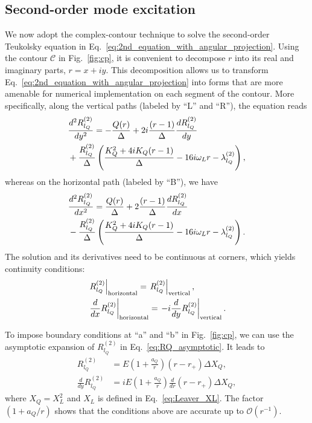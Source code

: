 \documentclass[aps,prd,amsmath,floats,floatfix, twocolumn,
superscriptaddress,nofootinbib,showpacs]{revtex4-1}
\begin{document}
\subsection{Second-order mode excitation}
\label{subsec:contour_2nd_excitation}
We now adopt the complex-contour technique to solve the second-order Teukolsky equation in Eq.~\eqref{eq:2nd_equation_with_angular_projection}. Using the contour $\mathcal{C}$ in Fig.~\ref{fig:cp}, it is convenient to decompose $r$ into its real and imaginary parts, $r=x+iy$. This decomposition allows us to transform Eq.~\eqref{eq:2nd_equation_with_angular_projection} into forms that are more amenable for numerical implementation on each segment of the contour. More specifically, along the vertical paths (labeled by ``L'' and ``R''), the equation reads 
\begin{align}
    & \frac{d^2 R_{l_Q}^{(2)}}{dy^2}=-\frac{Q(r)}{\Delta}+2i\frac{(r-1)}{\Delta}\frac{d R_{l_Q}^{(2)}}{dy}\notag \\
    &+\frac{R_{l_Q}^{(2)}}{\Delta}\left(\frac{K_Q^2+4iK_Q(r-1)}{\Delta}-16i\omega_L r-\lambda^{(2)}_{l_Q}\right), \label{eq:2nd_t_eq_vertical}
\end{align}
whereas on the horizontal path (labeled by ``B''), we have
\begin{align}
    & \frac{d^2 R_{l_Q}^{(2)}}{dx^2}=\frac{Q(r)}{\Delta}+2\frac{(r-1)}{\Delta}\frac{d R_{l_Q}^{(2)}}{dx}\notag \\
    &-\frac{R_{l_Q}^{(2)}}{\Delta}\left(\frac{K_Q^2+4iK_Q(r-1)}{\Delta}-16i\omega_L r-\lambda^{(2)}_{l_Q}\right). \label{eq:2nd_t_eq_horizontal}
\end{align}
The solution and its derivatives need to be continuous at corners, which yields continuity conditions:
\begin{subequations}
\label{eq:continuity_eq}
    \begin{align}
    &\left.R_{l_Q}^{(2)}\right|_{\rm{horizontal}}=\left.R_{l_Q}^{(2)}\right|_{\rm{vertical}}, \\
    &\left.\frac{d}{dx}R_{l_Q}^{(2)}\right|_{\rm{horizontal}}=\left.-i\frac{d}{dy}R_{l_Q}^{(2)}\right|_{\rm{vertical}}. 
\end{align}
\end{subequations}

To impose boundary conditions at ``a'' and ``b'' in Fig.~\ref{fig:cp}, we can use the asymptotic expansion of $R_{l_Q}^{(2)}$ in Eq.~\eqref{eq:RQ_asymptotic}. It leads to
\begin{subequations}
\label{eq:bc_condition}
\begin{align}
    R_{l_Q}^{(2)}&=E \left(1+\frac{a_Q}{r}\right) (r-r_+)\Delta X_Q  \label{eq:2ndQNM_bc_R}, \\
    \frac{d}{dy}R_{l_Q}^{(2)}&=iE \left(1+\frac{a_Q}{r}\right) \frac{d}{d r} (r-r_+)\Delta X_Q,
\end{align}
\end{subequations}
where $X_Q=X_L^2$ and $X_L$ is defined in Eq.~\eqref{eq:Leaver_XL}. The factor $(1+a_Q/r)$ shows that the conditions above are accurate up to $\mathcal{O}(r^{-1})$.
\end{document}
